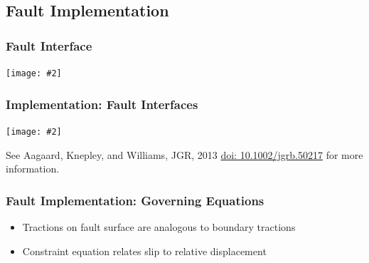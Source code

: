 \documentclass[aspectratio=169,hyperref=colorlinks]{beamer}
\newcommand{\includefigure}[2][]{{\centering\texttt{[image: \#2]}\par}}
\begin{document}
\subsection{Fault Implementation}

\begin{frame}[fragile]
  \frametitle{Fault Interface}

  \includefigure[height=7.0cm]{figs/domaindecomp}

\end{frame}


\begin{frame}
  \frametitle{Implementation: Fault Interfaces}
 
   \includefigure[height=6.2cm]{figs/cohesivecells}
   \vfill
   See Aagaard, Knepley, and Williams, JGR, 2013
   \href{http://dx.doi.org/10.1002/jgrb.50217}{doi:
     10.1002/jgrb.50217} for more information.
 \end{frame}
 

\begin{frame}[fragile]
  \frametitle{Fault Implementation: Governing Equations}

  \begin{itemize}
  \item Tractions on fault surface are analogous to boundary tractions
  \item Constraint equation relates slip to relative displacement
  \end{itemize}

\end{frame}
\end{document}
